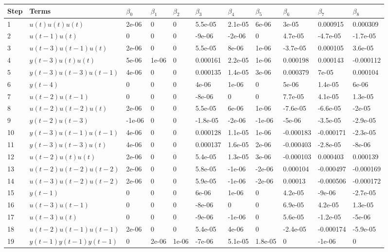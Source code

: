 \begin{tabular}{lllllllllll}
Step & Terms & $\beta_{0}$ & $\beta_{1}$ & $\beta_{2}$ & $\beta_{3}$ & $\beta_{4}$ & $\beta_{5}$ & $\beta_{6}$ & $\beta_{7}$ & $\beta_{8}$ \\ 
\hline 
1 & $u(t)u(t)u(t)$ & 2e-06 & 0 & 0 & 5.5e-05 & 2.1e-05 & 6e-06 & 3e-05 & 0.000915 & 0.000309 \\ 
2 & $u(t-1)u(t)$ & 0 & 0 & 0 & -9e-06 & -2e-06 & 0 & 4.7e-05 & -4.7e-05 & -1.7e-05 \\ 
3 & $u(t-3)u(t-1)u(t)$ & 2e-06 & 0 & 0 & 5.5e-05 & 8e-06 & 1e-06 & -3.7e-05 & 0.000105 & 3.6e-05 \\ 
4 & $y(t-3)u(t)u(t)$ & 5e-06 & 1e-06 & 0 & 0.000161 & 2.2e-05 & 1e-06 & 0.000198 & 0.000143 & -0.000112 \\ 
5 & $y(t-3)u(t-3)u(t-1)$ & 4e-06 & 0 & 0 & 0.000135 & 1.4e-05 & 3e-06 & 0.000379 & 7e-05 & 0.000104 \\ 
6 & $y(t-4)$ & 0 & 0 & 0 & 4e-06 & 1e-06 & 0 & 5e-06 & 1.4e-05 & 6e-06 \\ 
7 & $u(t-2)u(t-1)$ & 0 & 0 & 0 & -8e-06 & 0 & 0 & 7.7e-05 & 4.1e-05 & 1.3e-05 \\ 
8 & $u(t-2)u(t-2)u(t)$ & 2e-06 & 0 & 0 & 5.5e-05 & 6e-06 & 1e-06 & -7.6e-05 & -6.6e-05 & -2e-05 \\ 
9 & $y(t-2)u(t-3)$ & -1e-06 & 0 & 0 & -1.8e-05 & -2e-06 & -1e-06 & -5e-06 & -3.5e-05 & -2.9e-05 \\ 
10 & $y(t-3)u(t-1)u(t-1)$ & 4e-06 & 0 & 0 & 0.000128 & 1.1e-05 & 1e-06 & -0.000183 & -0.000171 & -2.3e-05 \\ 
11 & $y(t-3)u(t-3)u(t)$ & 4e-06 & 0 & 0 & 0.000137 & 1.6e-05 & 2e-06 & -0.000403 & -2.8e-05 & -8e-06 \\ 
12 & $u(t-2)u(t)u(t)$ & 2e-06 & 0 & 0 & 5.4e-05 & 1.3e-05 & 3e-06 & -0.000103 & 0.000403 & 0.000139 \\ 
13 & $u(t-2)u(t-2)u(t-2)$ & 2e-06 & 0 & 0 & 5.8e-05 & -1e-06 & -2e-06 & 0.000104 & -0.000497 & -0.000169 \\ 
14 & $u(t-3)u(t-2)u(t-2)$ & 2e-06 & 0 & 0 & 5.9e-05 & -1e-06 & -2e-06 & 0.00013 & -0.000506 & -0.000172 \\ 
15 & $y(t-1)$ & 0 & 0 & 0 & 6e-06 & 1e-06 & 0 & 4.2e-05 & -9e-06 & -2.7e-05 \\ 
16 & $u(t-3)u(t-1)$ & 0 & 0 & 0 & -8e-06 & 0 & 0 & 6.9e-05 & 4.2e-05 & 1.3e-05 \\ 
17 & $u(t-3)u(t)$ & 0 & 0 & 0 & -9e-06 & -1e-06 & 0 & 5.6e-05 & -1.2e-05 & -5e-06 \\ 
18 & $u(t-2)u(t-1)u(t-1)$ & 2e-06 & 0 & 0 & 5.4e-05 & 4e-06 & 0 & -2.4e-05 & -0.000174 & -5.9e-05 \\ 
19 & $y(t-1)y(t-1)y(t-1)$ & 0 & 2e-06 & 1e-06 & -7e-06 & 5.1e-05 & 1.8e-05 & 0 & -1e-06 & 0 \\ 
\hline 
\end{tabular}